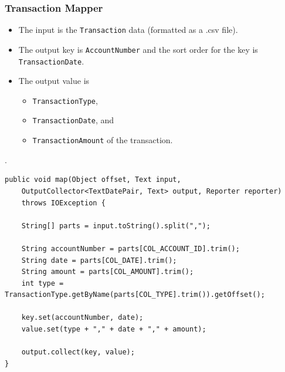 \subsubsection{Transaction Mapper}
\begin{itemize}
 \item The input is the \texttt{Transaction} data (formatted as a .csv file).
 \item The output key is \texttt{AccountNumber} and the sort order for the key is \texttt{TransactionDate}.
 \item The output value is
  \begin{itemize}
    \item \texttt{TransactionType},
    \item \texttt{TransactionDate}, and
    \item \texttt{TransactionAmount} of the transaction.
  \end{itemize}
\end{itemize}.
{
\singlespace
\small
\begin{verbatim}
public void map(Object offset, Text input, 
    OutputCollector<TextDatePair, Text> output, Reporter reporter) 
    throws IOException {

    String[] parts = input.toString().split(",");

    String accountNumber = parts[COL_ACCOUNT_ID].trim();
    String date = parts[COL_DATE].trim();
    String amount = parts[COL_AMOUNT].trim();
    int type = TransactionType.getByName(parts[COL_TYPE].trim()).getOffset();

    key.set(accountNumber, date);
    value.set(type + "," + date + "," + amount);

    output.collect(key, value);
}
\end{verbatim}
}
